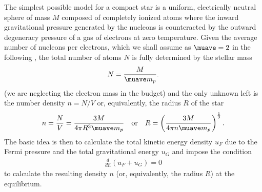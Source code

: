 The simplest possible model for a compact star is a uniform, electrically
neutral sphere of mass $M$ composed of completely ionized atoms where the inward
gravitational pressure generated by the nucleons is counteracted by the outward
degeneracy pressure of a gas of electrons at zero temperature.
Given the average number of nucleons per electrons, which we shall assume as
$\muave = 2$ in the following%
,
the total number of atoms $N$ is fully determined by the stellar mass
\begin{align}
  N = \frac{M}{\muave m_p}.
\end{align}
(we are neglecting the electron mass in the budget) and the only unknown left is
the number density $n = N/V$ or, equivalently, the radius $R$ of the star
\begin{align}\label{eq:wd_radius_density}
  n = \frac{N}{V} = \frac{3M}{4\pi R^3 \muave m_p} \quad\text{or}\quad
  R = \left( \frac{3M}{4\pi n \muave m_p} \right)^{\frac{1}{3}}.
\end{align}
The basic idea is then to calculate the total kinetic energy density $u_F$ due to the
Fermi pressure and the total gravitational energy $u_G$
and impose the condition
\begin{align}\label{eq:wd_equilibrium_condition}
  \frac{d}{dn} (u_F + u_G) = 0
\end{align}
to calculate the resulting density $n$ (or, equivalently, the radius $R$) at the
equilibrium.

\begin{marginfigure}
  
  \caption{Calculation of the gravitational binding energy of a uniform sphere
    with constant density $\rho$.}
  \label{fig:sphere_gravitational_energy}
\end{marginfigure}

